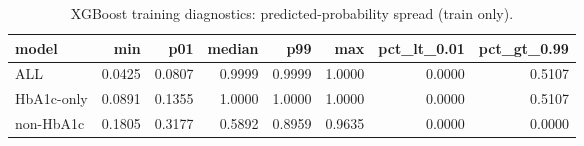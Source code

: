 \begin{table}[H]
\begin{center}
\begin{tabular}{lrrrrrrr}
\toprule
model & min & p01 & median & p99 & max & pct_lt_0.01 & pct_gt_0.99 \\
\midrule
ALL & 0.0425 & 0.0807 & 0.9999 & 0.9999 & 1.0000 & 0.0000 & 0.5107 \\
HbA1c-only & 0.0891 & 0.1355 & 1.0000 & 1.0000 & 1.0000 & 0.0000 & 0.5107 \\
non-HbA1c & 0.1805 & 0.3177 & 0.5892 & 0.8959 & 0.9635 & 0.0000 & 0.0000 \\
\bottomrule
\end{tabular}
\end{center}
\vspace{-5pt}
\caption{XGBoost training diagnostics: predicted-probability spread (train only).}
\label{tab:xgb_train_diagnostics}
\end{table}
